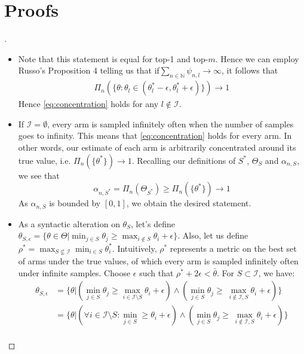 \section{Proofs}\label{section:txts_proofs}
\begin{proof}[]

  \begin{itemize}
  \item Note that this statement is equal for top-1 and top-$m$. Hence we can employ Russo's Proposition 4 telling us that if$\sum_{n \in \mathbb{N}} \psi_{n, l} \rightarrow \infty$, it follows that
  \begin{align}
    \Pi_n(\{\theta: \theta_l \in (\theta^*_l - \epsilon, \theta^*_l + \epsilon)\}) \rightarrow 1 \label{eq:concentration}
  \end{align}
  Hence \eqref{eq:concentration} holds for any $l \notin \mathcal{I}$.
  \item If $\mathcal{I} = \emptyset$, every arm is sampled infinitely often when the number of samples goes to infinity. This means that \eqref{eq:concentration} holds for every arm. In other words, our estimate of each arm is arbitrarily concentrated around its true value, i.e. $\Pi_n(\{\theta^*\}) \rightarrow 1$. Recalling our definitions of $S^*$, $\Theta_S$ and $\alpha_{n, S}$, we see that
  \[ \alpha_{n, S^*} = \Pi_n(\Theta_{S^*}) \geq \Pi_n(\{\theta^*\}) \rightarrow 1\]
  As $\alpha_{n, S}$ is bounded by $[0, 1]$, we obtain the desired statement.
  \item As a syntactic alteration on $\theta_S$, let's define $\theta_{S, \epsilon} = \{\theta \in \Theta | \min_{j \in S} \theta_j \geq \max_{i \notin S} \theta_i + \epsilon\}$. Also, let us define $\rho^* = \max_{S \not\subseteq \mathcal{I}} \min_{i \in S} \theta^*_i$. Intuitively, $\rho^*$ represents a metric on the best set of arms under the true values, of which every arm is sampled infinitely often under infinite samples.
  Choose $\epsilon$ such that $\rho^* + 2\epsilon < \bar{\theta}$.
  For $S \subset \mathcal{I}$, we have:
  \begin{align}
    \theta_{S, \epsilon} &= \{\theta|(\min_{j \in S} \theta_j \geq \max_{i \in \mathcal{I} \setminus S} \theta_i + \epsilon) \wedge (\min_{j \in S} \theta_j \geq\ \max_{i \notin \mathcal{I}, S} \theta_i + \epsilon)\} \\
    &= \{\theta | (\forall i \in \mathcal{I} \setminus S: \min_{j \in S} \geq \theta_i + \epsilon) \wedge (\min_{j \in S} \theta_j \geq\ \max_{i \notin \mathcal{I}, S} \theta_i + \epsilon)\} \\

\end{align}
\end{itemize}
\end{proof}
